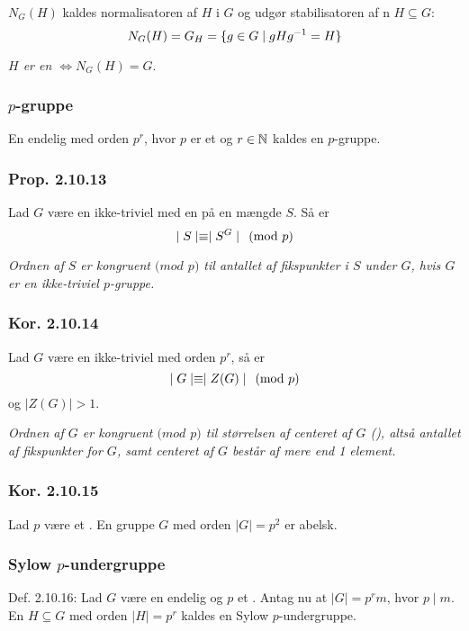$N_G(H)$ kaldes normalisatoren af $H$ i $G$ og udgør stabilisatoren af
n $H \subseteq G$:
\begin{equation*}
  N_G(H) = G_H = \{ g \in G \mid gHg^{-1} = H \}
\end{equation*}

\textit{$H$ er en  $\iff N_G(H) = G$}.

\subsubsection{$p$-gruppe}
\label{p-gruppe}
En endelig  med orden $p^r$, hvor $p$ er et  og
$r \in \mathbb{N}$ kaldes en $p$-gruppe.

\subsubsection{Prop. 2.10.13}
Lad $G$ være en ikke-triviel  med en 
på en mængde $S$. Så er
\begin{equation*}
  \mid S\mid \equiv \mid S^G\mid \pmod{p}
\end{equation*}

\textit{Ordnen af $S$ er kongruent $(mod$  $p)$ til antallet af fikspunkter i
$S$ under $G$, hvis $G$ er en ikke-triviel $p$-gruppe.}

\subsubsection{Kor. 2.10.14}
Lad $G$ være en ikke-triviel  med orden $p^r$, så er
\begin{equation*}
  \mid G\mid \equiv \mid Z(G)\mid \pmod{p}
\end{equation*}
og $\mid Z(G)\mid > 1$.

\textit{Ordnen af $G$ er kongruent $(mod$  $p)$ til størrelsen af centeret af
$G$ (), altså antallet af fikspunkter for $G$, samt
centeret af $G$ består af mere end 1 element.}

\subsubsection{Kor. 2.10.15}
Lad $p$ være et . En gruppe $G$ med orden $\mid G\mid = p^2$ er
abelsk.

\subsubsection{Sylow $p$-undergruppe}
\label{Sylow p-undergruppe}
Def. 2.10.16: Lad $G$ være en endelig  og $p$ et
. Antag nu at $\mid G\mid = p^r m$, hvor $p \mid m$. En
 $H \subseteq G$ med orden $\mid H\mid = p^r$ kaldes en
Sylow $p$-undergruppe.

